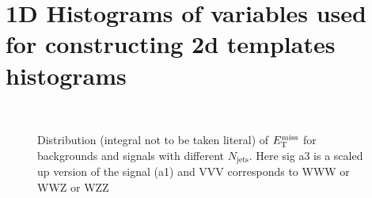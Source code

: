\section{1D Histograms of variables used for constructing 2d templates histograms}
\label{sec:1dhists}
\begin{figure}[htb]
\begin{center}
\\
\end{center}
\caption{Distribution (integral not to be taken literal) of $E_{\mathrm{T}}^{\mathrm{miss}}$ for backgrounds and signals with
different $N_\mathrm{jets}$. Here sig a3 is a scaled up version of the signal (a1) and VVV corresponds to
WWW or WWZ or WZZ}
\label{fig:1d_hists_mtzz}
\end{figure}

